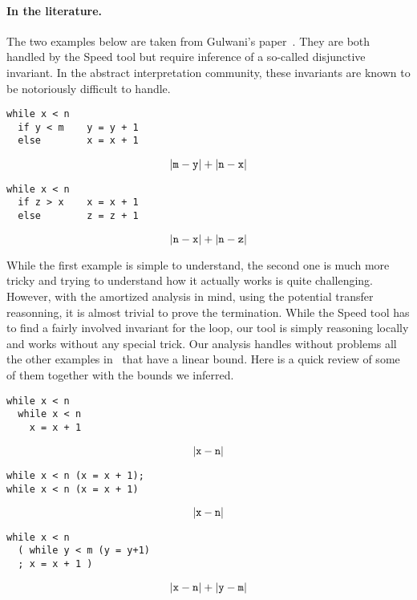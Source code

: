\documentclass[nocopyrightspace,preprint]{sigplanconf}
\begin{document}
\paragraph{In the literature.}
The two examples below are taken from Gulwani's paper~\cite{Gulwani-speed}.
They are both handled by the Speed tool but require inference of a so-called
disjunctive invariant.  In the abstract interpretation community, these
invariants are known to be notoriously difficult to handle.

\begin{minipage}{0.45\textwidth}
\begin{lstlisting}
while x < n
  if y < m    y = y + 1
  else        x = x + 1
\end{lstlisting}
$$
|{\tt m} - {\tt y}| + |{\tt n} - {\tt x}|
$$
\end{minipage}
\begin{minipage}{0.45\textwidth}
\begin{lstlisting}
while x < n
  if z > x    x = x + 1
  else        z = z + 1
\end{lstlisting}
$$
|{\tt n} - {\tt x}| + |{\tt n} - {\tt z}|
$$
\end{minipage}

\hspace{1ex}

While the first
example is simple to understand, the second one is much more
tricky and trying to understand how it actually works is quite challenging.
However, with the amortized analysis in mind, using the potential transfer
reasonning, it is almost trivial to prove the termination.  While the Speed
tool has to find a fairly involved invariant for the loop, our tool is simply
reasoning locally and works without any special trick.
%
Our analysis handles without problems all the other examples
in~\cite{Gulwani-speed} that have a linear bound.  Here is
a quick review of some of them together with the bounds we
inferred.

\begin{minipage}[b]{0.30\textwidth}
\begin{lstlisting}
while x < n
  while x < n
    x = x + 1
\end{lstlisting}
$$
|{\tt x} - {\tt n}|
$$
\end{minipage}
\begin{minipage}[b]{0.30\textwidth}
\begin{lstlisting}
while x < n (x = x + 1);
while x < n (x = x + 1)
\end{lstlisting}
$$
|{\tt x} - {\tt n}|
$$
\end{minipage}
\begin{minipage}[b]{0.30\textwidth}
\begin{lstlisting}
while x < n
  ( while y < m (y = y+1)
  ; x = x + 1 )
\end{lstlisting}
$$
|{\tt x} - {\tt n}|
+|{\tt y} - {\tt m}|
$$
\end{minipage}
\end{document}
